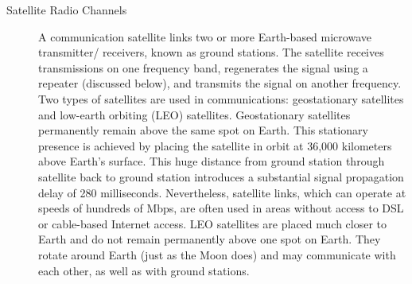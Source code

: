 \documentclass{article}
\begin{document}
\begin{description}
    \item[Satellite Radio Channels] A communication satellite links two or more Earth-based microwave transmitter/
    receivers, known as ground stations. The satellite receives transmissions on one frequency
    band, regenerates the signal using a repeater (discussed below), and transmits
    the signal on another frequency. Two types of satellites are used in communications:
    geostationary satellites and low-earth orbiting (LEO) satellites.
    Geostationary satellites permanently remain above the same spot on Earth. This
    stationary presence is achieved by placing the satellite in orbit at 36,000 kilometers
    above Earth’s surface. This huge distance from ground station through satellite back
    to ground station introduces a substantial signal propagation delay of 280 milliseconds.
    Nevertheless, satellite links, which can operate at speeds of hundreds of Mbps,
    are often used in areas without access to DSL or cable-based Internet access.
    LEO satellites are placed much closer to Earth and do not remain permanently
    above one spot on Earth. They rotate around Earth (just as the Moon does) and may
    communicate with each other, as well as with ground stations.
\end{description}
\end{document}
